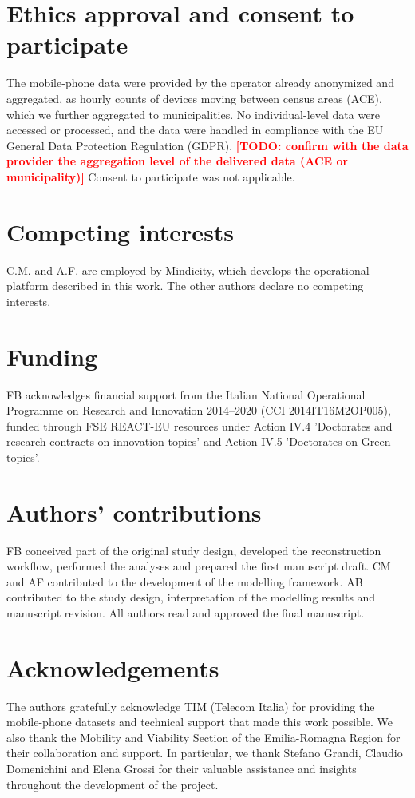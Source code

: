 \documentclass[pdflatex,Numbered]{sn-jnl}
\newcommand{\todo}[1]{\textcolor{red}{\textbf{[TODO: #1]}}}
\begin{document}
\section*{Ethics approval and consent to participate}

The mobile-phone data were provided by the operator already anonymized and aggregated, as hourly counts of devices moving between census areas (ACE), which we further aggregated to municipalities. No individual-level data were accessed or processed, and the data were handled in compliance with the EU General Data Protection Regulation (GDPR). \todo{confirm with the data provider the aggregation level of the delivered data (ACE or municipality)} Consent to participate was not applicable.

\section*{Competing interests}

C.M. and A.F. are employed by Mindicity, which develops the operational platform described in this work. The other authors declare no competing interests.

\section*{Funding}

FB acknowledges financial support from the Italian National Operational Programme on Research and Innovation 2014--2020 (CCI 2014IT16M2OP005), funded through FSE REACT-EU resources under Action IV.4 'Doctorates and research contracts on innovation topics' and Action IV.5 'Doctorates on Green topics'.

\section*{Authors' contributions}

FB conceived part of the original study design, developed the reconstruction workflow, performed the analyses and prepared the first manuscript draft. CM and AF contributed to the development of the modelling framework. AB contributed to the study design, interpretation of the modelling results and manuscript revision. All authors read and approved the final manuscript.

\section*{Acknowledgements}

The authors gratefully acknowledge TIM (Telecom Italia) for providing the mobile-phone datasets and technical support that made this work possible. We also thank the Mobility and Viability Section of the Emilia-Romagna Region for their collaboration and support. In particular, we thank Stefano Grandi, Claudio Domenichini and Elena Grossi for their valuable assistance and insights throughout the development of the project.




\end{document}
